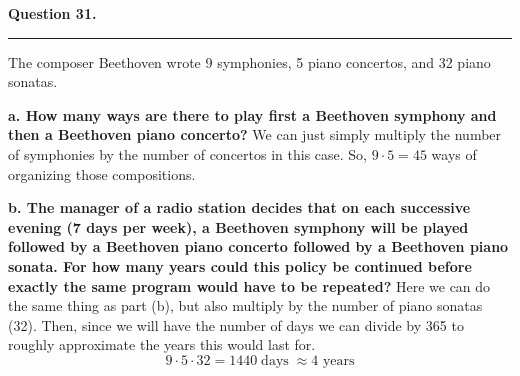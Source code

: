 \textbf{Question 31.} \\
\hrule 

The composer Beethoven wrote 9 symphonies, 5 piano concertos, and 32 piano sonatas.

\textbf{a. How many ways are there to play first a Beethoven symphony and then a Beethoven piano concerto?} \newline 
We can just simply multiply the number of symphonies by the number of concertos in this case. So, $\boxed{9 \cdot 5 = 45}$ ways of organizing those compositions. 

\textbf{b. The manager of a radio station decides that on each successive evening (7 days per week), a Beethoven symphony will be played followed by a Beethoven piano concerto followed by a Beethoven piano sonata. For how many years could this policy be continued before exactly the same program would have to be repeated?} \newline 
Here we can do the same thing as part (b), but also multiply by the number of piano sonatas (32). Then, since we will have the number of days we can divide by 365 to roughly approximate the years this would last for. 
\[9 \cdot 5 \cdot 32 = \boxed{1440 \; \text{days} \; \approx \text{4 years}}\]
